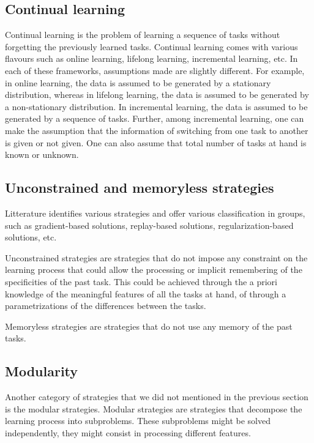 \documentclass[twocolumn]{article}
\begin{document}
\subsection{Continual learning}

Continual learning is the problem of learning a sequence of tasks without forgetting the previously learned tasks. Continual learning comes with various flavours such as online learning, lifelong learning, incremental learning, etc. In each of these frameworks, assumptions made are slightly different. For example, in online learning, the data is assumed to be generated by a stationary distribution, whereas in lifelong learning, the data is assumed to be generated by a non-stationary distribution. In incremental learning, the data is assumed to be generated by a sequence of tasks. Further, among incremental learning, one can make the assumption that the information of switching from one task to another is given or not given. One can also assume that total number of tasks at hand is known or unknown.

\subsection{Unconstrained and memoryless strategies}

Litterature identifies various strategies and offer various classification in groups, such as gradient-based solutions, replay-based solutions, regularization-based solutions, etc.

\vspace{1mm}
\noindent
Unconstrained strategies are strategies that do not impose any constraint on the learning process that could allow the processing or implicit remembering of the specificities of the past task. This could be achieved through the a priori knowledge of the meaningful features of all the tasks at hand, of through a parametrizations of the differences between the tasks. 

\vspace{1mm}
\noindent
Memoryless strategies are strategies that do not use any memory of the past tasks. 

\subsection{Modularity}

Another category of strategies that we did not mentioned in the previous section is the modular strategies. Modular strategies are strategies that decompose the learning process into subproblems. These subproblems might be solved independently, they might consist in processing different features. 
\end{document}
